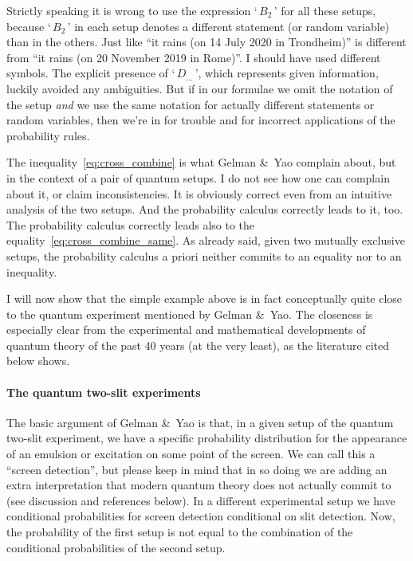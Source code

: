 \documentclass[\ifafour a4paper,12pt,\else a5paper,10pt,\fi%
onecolumn,oneside,article,%
british%
]{memoir}
\newcommand*{\defquote}[1]{`\,#1\,'}
\theoremstyle{remark}
\theoremstyle{innote}
\newcommand*{\citey}{\parencites*}
\newcommand*{\amp}{\&}
\renewcommand*{\|}[1][]{\nonscript\,#1\vert\nonscript\;\mathopen{}}
\begin{document}
Strictly speaking it is wrong to use the expression \defquote{$B_{2}$} for
all these setups, because \defquote{$B_{2}$} in each setup denotes a
different statement (or random variable) than in the others. Just like
\enquote{it rains (on 14 July 2020 in Trondheim)} is different from
\enquote{it rains (on 20 November 2019 in Rome)}. I should have used
different symbols. The explicit presence of \defquote{$D_{\dotso}$}, which
represents given information, luckily avoided any ambiguities. But if in
our formulae we omit the notation of the setup \emph{and} we use the same
notation for actually different statements or random variables, then we're
in for trouble and for incorrect applications of the probability rules.

\medskip

The inequality~\eqref{eq:cross_combine} is what Gelman \amp\ Yao
\citey[p.~2]{gelmanetal2020} complain about, but in the context of a pair
of quantum setups. I do not see how one can complain about it, or claim
inconsistencies. It is obviously correct even from an intuitive analysis of
the two setups. And the probability calculus correctly leads to it, too.
The probability calculus correctly leads also to the
equality~\eqref{eq:cross_combine_same}. As already said, given two mutually
exclusive setups, the probability calculus a priori neither commits to an
equality nor to an inequality.


I will now show that the simple example above is in fact conceptually quite
close to the quantum experiment mentioned by Gelman \amp\ Yao. The
closeness is especially clear from the experimental and mathematical
developments of quantum theory of the past 40 years (at the very least), as
the literature cited below shows.

\bigskip

\paragraph{The quantum two-slit experiments}

The basic argument of Gelman \amp\ Yao is that, in a given setup of the
quantum two-slit experiment, we have a specific probability distribution
for the appearance of an emulsion or excitation on some point of the
screen. We can call this a \enquote{screen detection}, but please keep in
mind that in so doing we are adding an extra interpretation that modern
quantum theory does not actually commit to (see discussion and references
below). In a different experimental setup we have conditional probabilities
for screen detection conditional on slit detection. Now, the probability of
the first setup is not equal to the combination of the conditional
probabilities of the second setup.
\end{document}
